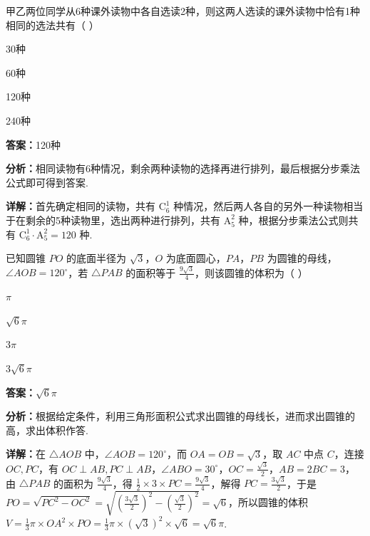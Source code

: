 \begin{question}[points=5]
甲乙两位同学从6种课外读物中各自选读2种，则这两人选读的课外读物中恰有1种相同的选法共有（ ）
\begin{choices}
  \item 30种
  \item 60种
  \item 120种
  \item 240种
\end{choices}
\begin{solution}
\textbf{答案：}120种

\textbf{分析：}相同读物有6种情况，剩余两种读物的选择再进行排列，最后根据分步乘法公式即可得到答案.

\textbf{详解：}首先确定相同的读物，共有 $\mathrm{C}_6^1$ 种情况，然后两人各自的另外一种读物相当于在剩余的5种读物里，选出两种进行排列，共有 $\mathrm{A}_5^2$ 种，根据分步乘法公式则共有 $\mathrm{C}_6^1\cdot\mathrm{A}_5^2=120$ 种.
\end{solution}
\end{question}

\begin{question}[points=5]
已知圆锥 $PO$ 的底面半径为 $\sqrt{3}$，$O$ 为底面圆心，$PA$，$PB$ 为圆锥的母线，$\angle AOB=120^\circ$，若 $\triangle PAB$ 的面积等于 $\frac{9\sqrt{3}}{4}$，则该圆锥的体积为（ ）
\begin{choices}
  \item $\pi$
  \item $\sqrt{6}\pi$
  \item $3\pi$
  \item $3\sqrt{6}\pi$
\end{choices}
\begin{solution}
\textbf{答案：}$\sqrt{6}\pi$

\textbf{分析：}根据给定条件，利用三角形面积公式求出圆锥的母线长，进而求出圆锥的高，求出体积作答.

\textbf{详解：}在 $\triangle AOB$ 中，$\angle AOB=120^\circ$，而 $OA=OB=\sqrt{3}$，取 $AC$ 中点 $C$，连接 $OC,PC$，有 $OC\perp AB,PC\perp AB$，$\angle ABO=30^\circ$，$OC=\frac{\sqrt{3}}{2}$，$AB=2BC=3$，由 $\triangle PAB$ 的面积为 $\frac{9\sqrt{3}}{4}$，得 $\frac{1}{2}\times 3\times PC=\frac{9\sqrt{3}}{4}$，解得 $PC=\frac{3\sqrt{3}}{2}$，于是 $PO=\sqrt{PC^2-OC^2}=\sqrt{(\frac{3\sqrt{3}}{2})^2-(\frac{\sqrt{3}}{2})^2}=\sqrt{6}$，所以圆锥的体积 $V=\frac{1}{3}\pi\times OA^2\times PO=\frac{1}{3}\pi\times (\sqrt{3})^2\times \sqrt{6}=\sqrt{6}\pi$.
\end{solution}
\end{question}

